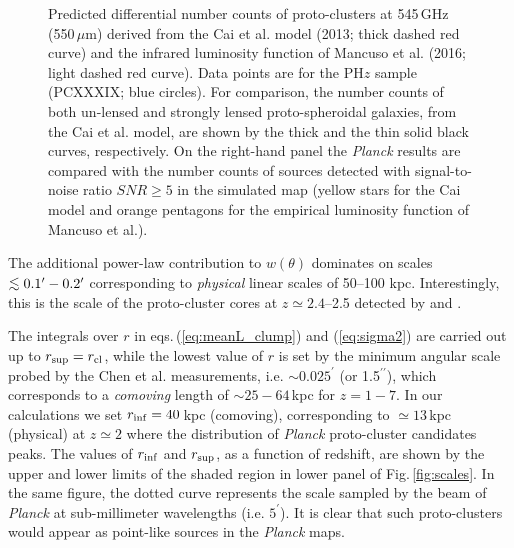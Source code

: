 \documentclass[useAMS,usenatbib]{mn2e}
\def\simlt{\mathrel{\rlap{\lower 3pt\hbox{$\sim$}}\raise 2.0pt\hbox{$<$}}}
\begin{document}
\begin{figure*}
\vspace{-5.0cm}
\hspace{-0.4cm}
\vspace{-0.8cm}
\caption{Predicted differential number counts of proto-clusters at
  545\,GHz (550\,$\mu$m) derived from the Cai et al. model (2013; thick dashed red
  curve) and the infrared luminosity function of Mancuso et al. (2016;
  light dashed red curve). Data points are for the
  PH$z$ sample (PCXXXIX; blue circles). For comparison, the number counts of both
  un-lensed and strongly lensed proto-spheroidal galaxies, from the Cai et
  al. model, are
  shown by the thick and the thin solid black curves, respectively. On
  the right-hand panel the {\it Planck} results are compared with the number
  counts of sources detected with signal-to-noise ratio $SNR\geq5$ in the simulated map
  (yellow stars for the Cai model and orange pentagons for the
  empirical luminosity function of Mancuso et al.).}
\label{fig:dNdlgFclump_545GHz}
\end{figure*}


The additional power-law contribution to $w(\theta)$ dominates on scales $\simlt 0.1^\prime-0.2^\prime$ corresponding to \textit{physical} linear scales of 50--100 kpc. Interestingly, this is the scale of the proto-cluster cores at $z\simeq 2.4$--2.5 detected by \citet{Ivison2013} and \citet{Wang2016}.

The integrals over $r$ in eqs.\,(\ref{eq:meanL_clump}) and (\ref{eq:sigma2}) are carried out up to $r_{\rm sup}=r_{\rm cl}$, while the lowest value of $r$ is set by the minimum angular scale probed by the Chen et al. measurements, i.e. $\sim 0.025^{\prime}$ (or 1.5$^{\prime\prime}$), which corresponds to a \textit{comoving} length of $\sim25-64$\,kpc for $z=1-7$. In our calculations we set $r_{\rm inf}=40$\,kpc (comoving), corresponding to $\simeq 13\,$kpc (physical) at $z\simeq 2$ where the distribution of \textit{Planck} proto-cluster candidates peaks.
The values of
$r_{\rm inf}$ and $r_{\rm sup}$, as a function of redshift, are shown by the upper and lower limits
of the shaded region in lower panel of Fig.\,\ref{fig:scales}.
In the same figure, the dotted curve represents the
scale sampled by the beam of {\it Planck} at sub-millimeter
wavelengths (i.e. $5^{\prime}$). It is clear that such proto-clusters
would appear as point-like sources in the {\it Planck} maps.
\end{document}
